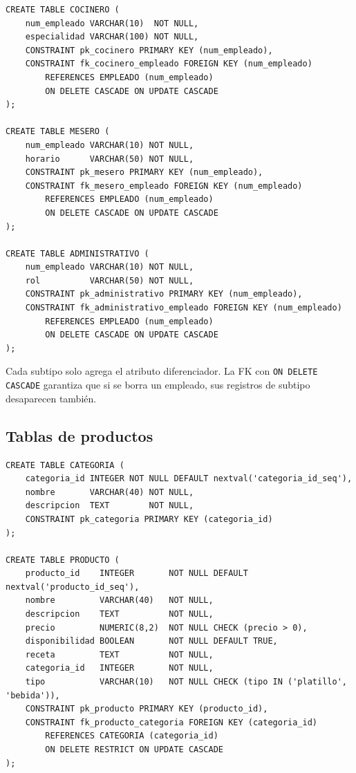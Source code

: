 \documentclass[12pt, a4paper]{article}
\begin{document}
\begin{lstlisting}[caption={Subtipos de EMPLEADO}]
CREATE TABLE COCINERO (
    num_empleado VARCHAR(10)  NOT NULL,
    especialidad VARCHAR(100) NOT NULL,
    CONSTRAINT pk_cocinero PRIMARY KEY (num_empleado),
    CONSTRAINT fk_cocinero_empleado FOREIGN KEY (num_empleado)
        REFERENCES EMPLEADO (num_empleado)
        ON DELETE CASCADE ON UPDATE CASCADE
);

CREATE TABLE MESERO (
    num_empleado VARCHAR(10) NOT NULL,
    horario      VARCHAR(50) NOT NULL,
    CONSTRAINT pk_mesero PRIMARY KEY (num_empleado),
    CONSTRAINT fk_mesero_empleado FOREIGN KEY (num_empleado)
        REFERENCES EMPLEADO (num_empleado)
        ON DELETE CASCADE ON UPDATE CASCADE
);

CREATE TABLE ADMINISTRATIVO (
    num_empleado VARCHAR(10) NOT NULL,
    rol          VARCHAR(50) NOT NULL,
    CONSTRAINT pk_administrativo PRIMARY KEY (num_empleado),
    CONSTRAINT fk_administrativo_empleado FOREIGN KEY (num_empleado)
        REFERENCES EMPLEADO (num_empleado)
        ON DELETE CASCADE ON UPDATE CASCADE
);
\end{lstlisting}

Cada subtipo solo agrega el atributo diferenciador. La FK con \texttt{ON DELETE CASCADE} garantiza que si se borra un empleado, sus registros de subtipo desaparecen tambi\'en.

\subsection{Tablas de productos}

\begin{lstlisting}[caption={CATEGORIA y PRODUCTO}]
CREATE TABLE CATEGORIA (
    categoria_id INTEGER NOT NULL DEFAULT nextval('categoria_id_seq'),
    nombre       VARCHAR(40) NOT NULL,
    descripcion  TEXT        NOT NULL,
    CONSTRAINT pk_categoria PRIMARY KEY (categoria_id)
);

CREATE TABLE PRODUCTO (
    producto_id    INTEGER       NOT NULL DEFAULT nextval('producto_id_seq'),
    nombre         VARCHAR(40)   NOT NULL,
    descripcion    TEXT          NOT NULL,
    precio         NUMERIC(8,2)  NOT NULL CHECK (precio > 0),
    disponibilidad BOOLEAN       NOT NULL DEFAULT TRUE,
    receta         TEXT          NOT NULL,
    categoria_id   INTEGER       NOT NULL,
    tipo           VARCHAR(10)   NOT NULL CHECK (tipo IN ('platillo', 'bebida')),
    CONSTRAINT pk_producto PRIMARY KEY (producto_id),
    CONSTRAINT fk_producto_categoria FOREIGN KEY (categoria_id)
        REFERENCES CATEGORIA (categoria_id)
        ON DELETE RESTRICT ON UPDATE CASCADE
);
\end{lstlisting}
\end{document}
